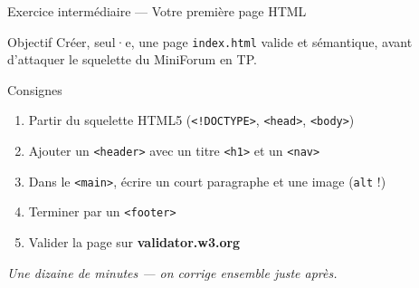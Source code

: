\documentclass[aspectratio=169,11pt]{beamer}
\begin{document}
\begin{frame}{Exercice intermédiaire --- Votre première page HTML}
  \begin{exampleblock}{Objectif}
    Créer, seul·e, une page \texttt{index.html} valide et sémantique, avant d'attaquer le squelette du MiniForum en TP.
  \end{exampleblock}
  \vspace{0.2cm}
  \begin{block}{Consignes}
    \begin{enumerate}
      \item Partir du squelette HTML5 (\texttt{<!DOCTYPE>}, \texttt{<head>}, \texttt{<body>})
      \item Ajouter un \texttt{<header>} avec un titre \texttt{<h1>} et un \texttt{<nav>}
      \item Dans le \texttt{<main>}, écrire un court paragraphe et une image (\texttt{alt} !)
      \item Terminer par un \texttt{<footer>}
      \item Valider la page sur \textbf{validator.w3.org}
    \end{enumerate}
  \end{block}
  \begin{center}
    \small\itshape Une dizaine de minutes --- on corrige ensemble juste après.
  \end{center}
\end{frame}
\end{document}

